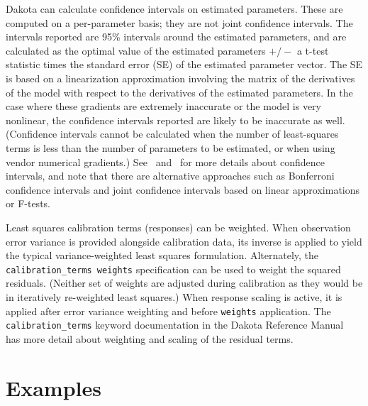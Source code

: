 Dakota can calculate confidence intervals on estimated parameters.
These are computed on a per-parameter basis; they are not joint
confidence intervals. The intervals reported are 95\% intervals around
the estimated parameters, and are calculated as the optimal value of
the estimated parameters $+/-$ a t-test statistic times the standard
error (SE) of the estimated parameter vector. The SE is based on a
linearization approximation involving the matrix of the derivatives of
the model with respect to the derivatives of the estimated
parameters. In the case where these gradients are extremely inaccurate
or the model is very nonlinear, the confidence intervals reported are
likely to be inaccurate as well.  (Confidence intervals cannot be
calculated when the number of least-squares terms is less than the
number of parameters to be estimated, or when using vendor numerical
gradients.)  See~\cite{Seb03} and~\cite{Vug07} for more details about
confidence intervals, and note that there are alternative approaches
such as Bonferroni confidence intervals and joint confidence intervals
based on linear approximations or F-tests.

Least squares calibration terms (responses) can be weighted.  When
observation error variance is provided alongside calibration data, its
inverse is applied to yield the typical variance-weighted least
squares formulation.  Alternately, the \texttt{calibration\_terms
  weights} specification can be used to weight the squared
residuals. (Neither set of weights are adjusted during calibration as
they would be in iteratively re-weighted least squares.)  When
response scaling is active, it is applied after error variance
weighting and before \texttt{weights} application.  The
\texttt{calibration\_terms} keyword documentation in the Dakota
Reference Manual~\cite{RefMan} has more detail about weighting and
scaling of the residual terms.

\section{Examples}\label{nls:examples}

